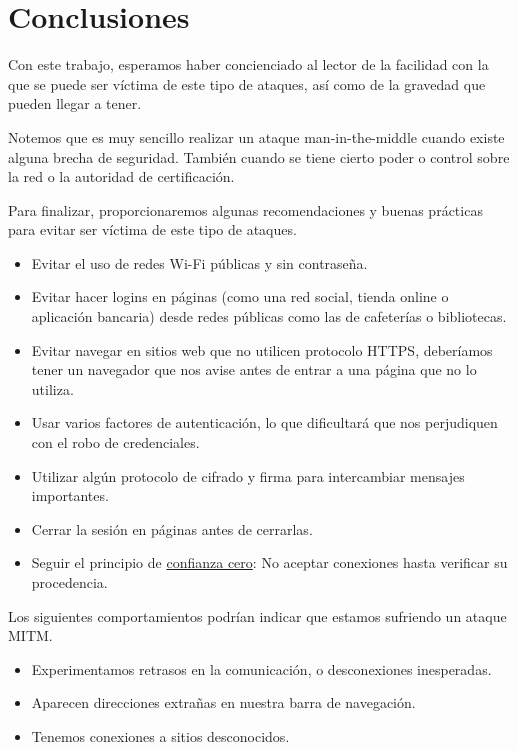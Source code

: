 \documentclass[11pt]{article}
\begin{document}
\section{Conclusiones}

Con este trabajo, esperamos haber concienciado al lector de la facilidad con la que se puede ser víctima de este tipo de ataques, así como
de la gravedad que pueden llegar a tener.

Notemos que es muy sencillo realizar un ataque man-in-the-middle cuando existe alguna brecha de seguridad. También cuando se tiene cierto poder
o control sobre la red o la autoridad de certificación.

Para finalizar, proporcionaremos algunas recomendaciones y buenas prácticas para evitar ser víctima de este tipo de ataques.
\begin{itemize}
	\item Evitar el uso de redes Wi-Fi públicas y sin contraseña.
	\item Evitar hacer logins en páginas (como una red social, tienda online o aplicación bancaria) desde redes públicas como las de cafeterías
	o bibliotecas.
	\item Evitar navegar en sitios web que no utilicen protocolo HTTPS, deberíamos tener un navegador que nos avise antes de entrar a una página que
	no lo utiliza.
	\item Usar varios factores de autenticación, lo que dificultará que nos perjudiquen con el robo de credenciales.
	\item Utilizar algún protocolo de cifrado y firma para intercambiar mensajes importantes.
	\item Cerrar la sesión en páginas antes de cerrarlas.
	\item Seguir el principio de \href{https://www.csoonline.com/article/3247848/what-is-zero-trust-a-model-for-more-effective-security.html}{confianza cero}: No aceptar conexiones hasta verificar su procedencia.
\end{itemize}

Los siguientes comportamientos podrían indicar que estamos sufriendo un ataque MITM.
\begin{itemize}
	\item Experimentamos retrasos en la comunicación, o desconexiones inesperadas.
	\item Aparecen direcciones extrañas en nuestra barra de navegación.
	\item Tenemos conexiones a sitios desconocidos.
\end{itemize}
\end{document}

